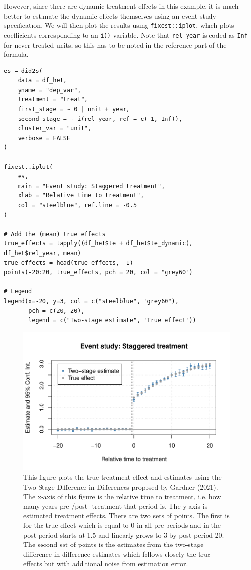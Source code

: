 However, since there are dynamic treatment effects in this example, it is much better to estimate the dynamic effects themselves using an event-study specification. We will then plot the results using \texttt{fixest::iplot}, which plots coefficients corresponding to an \texttt{i()} variable. Note that \texttt{rel\_year} is coded as \texttt{Inf} for never-treated units, so this has to be noted in the reference part of the formula.

\begin{verbatim}
es = did2s(
    data = df_het, 
    yname = "dep_var", 
    treatment = "treat",
    first_stage = ~ 0 | unit + year, 
    second_stage = ~ i(rel_year, ref = c(-1, Inf)),
    cluster_var = "unit", 
    verbose = FALSE
)

fixest::iplot(
    es, 
    main = "Event study: Staggered treatment", 
    xlab = "Relative time to treatment", 
    col = "steelblue", ref.line = -0.5
)

# Add the (mean) true effects
true_effects = tapply((df_het$te + df_het$te_dynamic), df_het$rel_year, mean)
true_effects = head(true_effects, -1)
points(-20:20, true_effects, pch = 20, col = "grey60")

# Legend
legend(x=-20, y=3, col = c("steelblue", "grey60"), 
       pch = c(20, 20), 
       legend = c("Two-stage estimate", "True effect"))
\end{verbatim}

\begin{figure}
\includegraphics[width=1\linewidth]{did2s_files/figure-latex/dynamic-1} \caption{This figure plots the true treatment effect and estimates using the Two-Stage Difference-in-Differences proposed by Gardner (2021). The x-axis of this figure is the relative time to treatment, i.e. how many years pre-/post- treatment that period is. The y-axis is estimated treatment effects. There are two sets of points. The first is for the true effect which is equal to 0 in all pre-periods and in the post-period starts at 1.5 and linearly grows to 3 by post-period 20. The second set of points is the estimates from the two-stage difference-in-difference estimates which follows closely the true effects but with additional noise from estimation error.}\label{fig:dynamic}
\end{figure}

